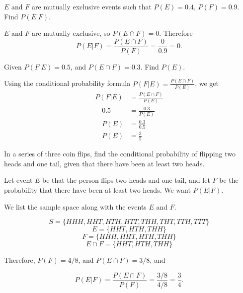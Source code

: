 \begin{example}
    \( E \) and \( F \) are mutually exclusive events such that \( P(E) = 0.4 \), \( P(F) = 0.9 \). Find \( P(E | F) \).
\end{example}

\begin{solution}
    \( E \) and \( F \) are mutually exclusive, so \( P(E \cap F) = 0 \).
    Therefore \[ P(E | F) = \frac{P(E \cap F)}{P(F)} = \frac{0}{0.9} = 0. \]
\end{solution}

\begin{example}
    Given \( P(F | E) = 0.5 \), and \( P(E \cap F) = 0.3 \). Find \( P(E) \).
\end{example}

\begin{solution}
    Using the conditional probability formula \( P(F | E) = \frac{P(E \cap F)}{P(E)} \), we get
    \begin{align*}
        P(F | E)   & = \frac{P(E \cap F)}{P(E)} \\
        \quad 0.5  & = \frac{0.3}{P(E)}         \\
        \quad P(E) & = \frac{0.3}{0.5}          \\
        \quad P(E) & = \frac{3}{5}
    \end{align*}
\end{solution}

\begin{example}
    In a series of three coin flips, find the conditional probability of flipping two heads and one tail, given that there have been at least two heads.
\end{example}
\begin{solution}
    Let event \( E \) be that the person flips two heads and one tail, and let \( F \) be the probability that there have been at least two heads. We want \( P(E | F) \).

    We list the sample space along with the events \( E \) and \( F \).

    \[
        S = \{HHH, HHT, HTH, HTT, THH, THT, TTH, TTT\}
    \]
    \[
        E = \{HHT, HTH, THH\}
    \]
    \[
        F = \{HHH, HHT, HTH, THH\}
    \]
    \[
        E \cap F = \{HHT, HTH, THH\}
    \]

    Therefore, \( P(F) = 4/8 \), and \( P(E \cap F) = 3/8 \), and

    \[
        P(E | F) = \frac{P(E \cap F)}{P(F)} = \frac{3/8}{4/8} = \frac{3}{4}.
    \]
\end{solution}

